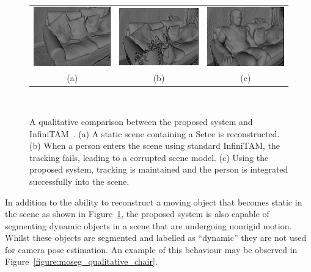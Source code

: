 \begin{figure}[!htbp]
  \centering
  \begin{tabular}{ccc}
    \includegraphics[height=.25\linewidth]{figures/moseg/original_sitting.png} &
    \includegraphics[height=.25\linewidth]{figures/moseg/infinitam_sitting.png} &
    \includegraphics[height=.25\linewidth]{figures/moseg/moseg_sitting.png}\\
    (a) & (b) & (c)
  \end{tabular}
  \caption[Motion Segmentation Qualitative Results I]
  {A qualitative comparison between the proposed system and InfiniTAM~\cite{Prisacariu2014}.
    (a) A static scene containing a Setee is reconstructed.
    (b) When a person enters the scene using standard InfiniTAM, the tracking
    fails, leading to a corrupted scene model.
    (c) Using the proposed system, tracking is maintained and the person is
    integrated successfully into the scene.}
~\label{figure:moseg_qualitative_setee}
\end{figure}

In addition to the ability to reconstruct a moving object that becomes static in
the scene as shown in Figure~\ref{figure:moseg_qualitative_setee}, the proposed
system is also capable of segmenting dynamic objects in a scene that are
undergoing nonrigid motion. Whilst these objects are segmented and labelled as
``dynamic'' they are not used for camera pose estimation. An example of this
behaviour may be observed in Figure~\ref{figure:moseg_qualitative_chair}.

